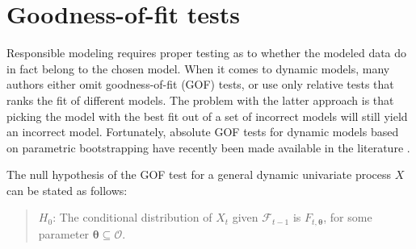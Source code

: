 \section{Goodness-of-fit tests}
\label{GOF}
Responsible modeling requires proper testing as to whether the modeled data do in fact belong
to the chosen model. When it comes to dynamic models, many authors either omit goodness-of-fit (GOF)
tests, or use only relative tests that ranks the fit of different models. The problem with the latter
approach is that picking the model with the best fit out of a set of incorrect models will still yield
an incorrect model. Fortunately, absolute GOF tests for dynamic models based on parametric
bootstrapping have recently been made available in the literature \citep{genestetal09,Remillard11b}.

The null hypothesis of the GOF test for a general dynamic univariate
process $X$ can be stated as follows:
\begin{quote}
$H_0$: The conditional distribution of $X_{t}$ given
$\mathcal{F}_{t-1}$ is $F_{t,\mathbf{\theta}}$, for some parameter
$\mathbf{\theta} \subseteq \mathcal{O}$.
\end{quote}

